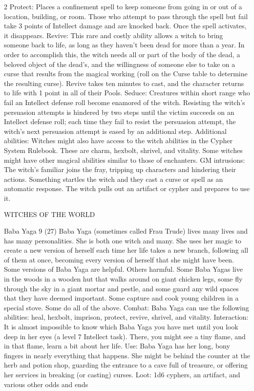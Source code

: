 \begin{multicols}{2}
Protect: Places a confinement spell to keep someone from going in or out of a location, building, or room. Those who attempt to pass through the spell but fail take 3 points of Intellect damage and are knocked back. Once the spell activates, it disappears.
Revive: This rare and costly ability allows a witch to bring someone back to life, as long as they haven’t been dead for more than a year. In order to accomplish this, the witch needs all or part of the body of the dead, a beloved object of the dead’s, and the willingness of someone else to take on a curse that results from the magical working (roll on the Curse table to determine the resulting curse). Revive takes ten minutes to cast, and the character returns to life with 1 point in all of their Pools.
Seduce: Creatures within short range who fail an Intellect defense roll become enamored of the witch. Resisting the witch’s persuasion attempts is hindered by two steps until the victim succeeds on an Intellect defense roll; each time they fail to resist the persuasion attempt, the witch’s next persuasion attempt is eased by an additional step.
Additional abilities: Witches might also have access to the witch abilities in the Cypher System Rulebook. These are charm, hexbolt, shrivel, and vitality. Some witches might have other magical abilities similar to those of enchanters.
GM intrusions: The witch’s familiar joins the fray, tripping up characters and hindering their actions.
Something startles the witch and they cast a curse or spell as an automatic response. The witch pulls out an artifact or cypher and prepares to use it.

WITCHES OF THE WORLD

Baba Yaga 9 (27)
Baba Yaga (sometimes called Frau Trude) lives many lives and has many personalities. She is both one witch and many. She uses her magic to create a new version of herself each time her
life takes a new branch, following all of them at once, becoming every version of herself that she might have been.
Some versions of Baba Yaga are helpful. Others harmful. Some Baba Yagas live
in the woods in a wooden hut that walks around on giant chicken legs, some
fly through the sky in a giant mortar and pestle, and some guard any wild spaces that they have deemed important. Some capture and cook young children in a special stove. Some do all of the above.
Combat: Baba Yaga can use the following abilities: heal, hexbolt, imprison, protect, revive, shrivel, and vitality.
Interaction: It is almost impossible to know which Baba Yaga you have met until you look deep in her eyes (a level 7 Intellect task). There, you might see a tiny flame, and in that flame, learn a bit about her life.
Use: Baba Yaga has her long, bony fingers in nearly everything that happens. She might be behind the counter at the herb and potion shop, guarding the entrance to a cave full of treasure, or offering her services in breaking (or casting) curses.
Loot: 1d6 cyphers, an artifact, and various other odds and ends


\end{multicols}
